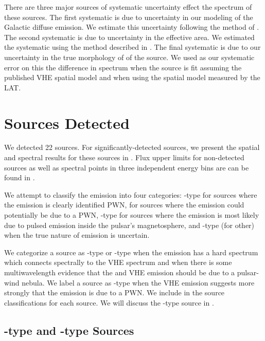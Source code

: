 There are three major sources of systematic uncertainty
effect the spectrum of these sources. The first systematic
is due to uncertainty in our modeling of the Galactic diffuse
emission.  We estimate this uncertainty following the method of
.  The second systematic is due
to uncertainty in the effective area.  We estimated the systematic
using the method described in \cite{ackermann_2012a_fermi-large}.
The final systematic is due to our uncertainty in the true morphology of
of the source. We used as our systematic error on this the difference
in spectrum when the source is fit assuming the published \ac{VHE}
spatial model and when using the spatial model measured by the LAT.

\section{Sources Detected} 



We detected 22 sources.  For significantly-detected sources,
we present the spatial and spectral results for these sources in
.  Flux upper limits for non-detected
sources as well as spectral points in three independent energy bins are
can be found in \cite{acero_2013a_constraints-galactic}.

We attempt to classify the \gev emission into four categories:
\PWNClass-type for sources where the \gev emission is clearly identified
\ac{PWN}, \PWNcClass for sources where the \gev emission could potentially
be due to a \ac{PWN}, \PSRClass-type for sources where the emission is
most likely due to pulsed emission inside the pulsar's magnetosphere,
and \OtherClass-type (for other) when the true nature of emission is
uncertain.

We categorize a source as \PWNClass-type or \PWNcClass-type when the
emission has a hard spectrum which connects spectrally to the \ac{VHE}
spectrum and when there is some multiwavelength evidence that the
\gev and \ac{VHE} emission should be due to a pulsar-wind nebula.
We label a source as \PWNClass-type when the \ac{VHE} emission suggests
more strongly that the emission is due to a \ac{PWN}.  We include
in  the source classifications
for each source.  We will discuss the \PWNClass-type source in
.

\subsection{\PWNClass-type and \PWNcClass-type Sources}

